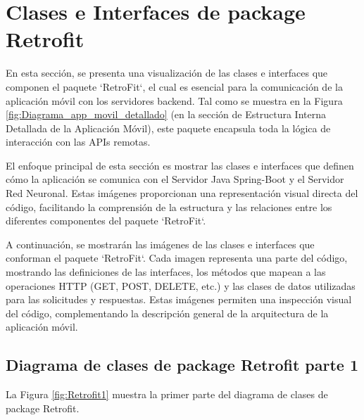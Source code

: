 \section{Clases e Interfaces de package Retrofit}

En esta sección, se presenta una visualización de las clases e interfaces que componen el paquete `RetroFit`, el cual es esencial para la comunicación de la aplicación móvil con los servidores backend. Tal como se muestra en la Figura \ref{fig:Diagrama_app_movil_detallado} (en la sección de Estructura Interna Detallada de la Aplicación Móvil), este paquete encapsula toda la lógica de interacción con las APIs remotas.

El enfoque principal de esta sección es mostrar las clases e interfaces que definen cómo la aplicación se comunica con el Servidor Java Spring-Boot y el Servidor Red Neuronal. Estas imágenes proporcionan una representación visual directa del código, facilitando la comprensión de la estructura y las relaciones entre los diferentes componentes del paquete `RetroFit`.

A continuación, se mostrarán las imágenes de las clases e interfaces que conforman el paquete `RetroFit`. Cada imagen representa una parte del código, mostrando las definiciones de las interfaces, los métodos que mapean a las operaciones HTTP (GET, POST, DELETE, etc.) y las clases de datos utilizadas para las solicitudes y respuestas. Estas imágenes permiten una inspección visual del código, complementando la descripción general de la arquitectura de la aplicación móvil.

\newpage

\subsection{Diagrama de clases de package Retrofit parte 1}

La Figura \ref{fig:Retrofit1} muestra la primer parte del diagrama de clases de package Retrofit.

